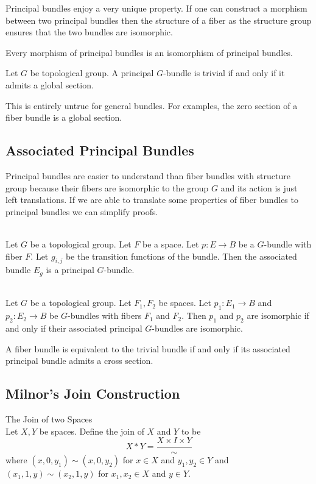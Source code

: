\documentclass[a4paper]{article}
\begin{document}
Principal bundles enjoy a very unique property. If one can construct a morphism between two principal bundles then the structure of a fiber as the structure group ensures that the two bundles are isomorphic. 

\begin{prp}{}{} Every morphism of principal bundles is an isomorphism of principal bundles. 
\end{prp}

\begin{prp}{}{} Let $G$ be topological group. A principal $G$-bundle is trivial if and only if it admits a global section. 
\end{prp}

This is entirely untrue for general bundles. For examples, the zero section of a fiber bundle is a global section. 

\subsection{Associated Principal Bundles}
Principal bundles are easier to understand than fiber bundles with structure group because their fibers are isomorphic to the group $G$ and its action is just left translations. If we are able to translate some properties of fiber bundles to principal bundles we can simplify proofs. 

\begin{prp}{}{}\\
Let $G$ be a topological group. Let $F$ be a space. Let $p:E\to B$ be a $G$-bundle with fiber $F$. Let $g_{i,j}$ be the transition functions of the bundle. Then the associated bundle $E_g$ is a principal $G$-bundle. 
\end{prp}

\begin{prp}{}{}\\
Let $G$ be a topological group. Let $F_1,F_2$ be spaces. Let $p_1:E_1\to B$ and $p_2:E_2\to B$ be $G$-bundles with fibers $F_1$ and $F_2$. Then $p_1$ and $p_2$ are isomorphic if and only if their associated principal $G$-bundles are isomorphic. 
\end{prp}

\begin{crl}{}{} A fiber bundle is equivalent to the trivial bundle if and only if its associated principal bundle admits a cross section. 
\end{crl}

\subsection{Milnor's Join Construction}
\begin{defn}{The Join of two Spaces}{}\\
Let $X,Y$ be spaces. Define the join of $X$ and $Y$ to be $$X\ast Y=\frac{X\times I\times Y}{\sim}$$ where $(x,0,y_1)\sim(x,0,y_2)$ for $x\in X$ and $y_1,y_2\in Y$ and $(x_1,1,y)\sim(x_2,1,y)$ for $x_1,x_2\in X$ and $y\in Y$. 
\end{defn}
\end{document}
